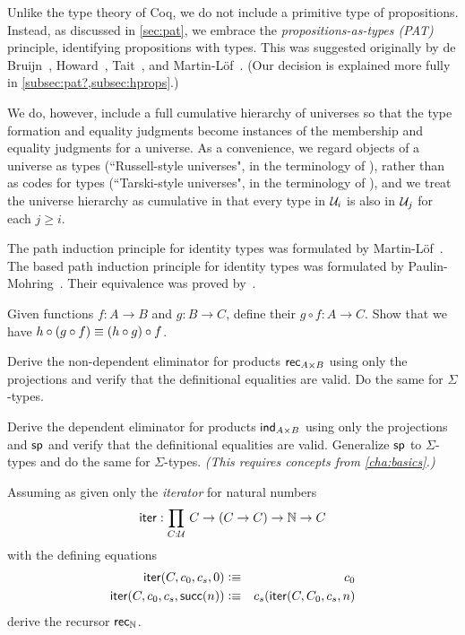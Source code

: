 Unlike the type theory of Coq, we do not include a primitive type of propositions.  Instead, as discussed in \autoref{sec:pat}, we embrace the \emph{propositions-as-types (PAT)} principle, identifying propositions with types.
This was suggested originally by de Bruijn~\cite{deBruijn-1973}, Howard~\cite{howard:pat}, Tait~\cite{Tait-1968}, and Martin-L\"{o}f~\cite{Martin-Lof-1972}.
(Our decision is explained more fully in \autoref{subsec:pat?,subsec:hprops}.)

We do, however, include a full cumulative hierarchy of universes so that the type formation and equality judgments become instances of the membership and equality judgments for a universe.
As a convenience, we regard objects of a universe as types (``Russell-style universes", in the terminology of \cite{martin-lof:bibliopolis}), rather than as codes for types (``Tarski-style universes", in the terminology of \cite{martin-lof:bibliopolis}), and we treat the universe hierarchy as cumulative in that every type in $\mathcal{U}_i$ is also in $\mathcal{U}_j$ for each $j\geq i$.

The path induction principle for identity types was formulated by Martin-L\"{o}f~\cite{pml-id}.  The based path induction principle for identity types was formulated by Paulin-Mohring~\cite{cpm-id}.
Their equivalence was proved by~\cite{cpm-id}. %

\sectionExercises

\begin{ex}\label{ex:composition}
  Given functions $f:A\to B$ and $g:B\to C$, define their  $g\circ f:A\to C$.
  Show that we have $h \circ (g\circ f) \equiv (h\circ g)\circ f$.
\end{ex}

\begin{ex}
Derive the non-dependent eliminator for products $\mathsf{rec}_{A\times B} $ using only the projections and verify that the definitional equalities are valid. Do the same for $\Sigma$-types.
\end{ex}

\begin{ex}
  Derive the dependent eliminator for products $\mathsf{ind}_{A\times B}$ using only the projections and $\mathsf{sp}$ and verify that the definitional equalities are valid. Generalize $\mathsf{sp}$ to $\Sigma$-types and do the same for $\Sigma$-types.
  \emph{(This requires concepts from \autoref{cha:basics}.)}
\end{ex}

\begin{ex}
Assuming as given only the \emph{iterator} for natural numbers
\[\ite : \prd{C:\UU} C \to (C \to C) \to \nat \to C \]
with the defining equations
\begin{eqnarray*}
\mathsf{iter}(C,c_0,c_s,0)  & \vcentcolon\equiv & c_0 \\
\mathsf{iter}(C,c_0,c_s,\mathsf{succ}(n)) & \vcentcolon\equiv & c_s(\mathsf{iter}(C,C_0,c_s,n)  
\end{eqnarray*}
derive the recursor $\mathsf{rec}_{\mathbb{N}}$.
\end{ex}


